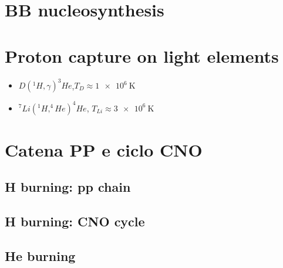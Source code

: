 \chapter{BB nucleosynthesis}
\PartialToc

\chapter{Proton capture on light elements}

\begin{itemize}
\item $D(^1H,\gamma)^3He$,$T_D\approx \SI{1e6}{\kelvin}$
\item $^7Li(^1H,^4He)^4He$, $T_{Li}\approx\SI{3e6}{\kelvin}$ 

\end{itemize}

\chapter{Catena PP e ciclo CNO}
\PartialToc

\section{H burning: pp chain}

\section{H burning: CNO cycle}

\section{He burning}
